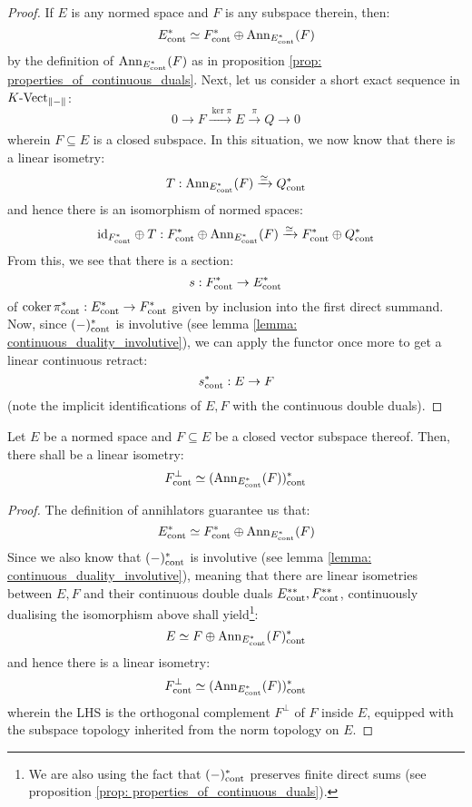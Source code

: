             \begin{proof}
                If $E$ is any normed space and $F$ is any subspace therein, then:
                    $$E^*_{\mathrm{cont}} \simeq F^*_{\mathrm{cont}} \oplus \mathrm{Ann}_{E^*_{\mathrm{cont}}}(F)$$
                by the definition of $\mathrm{Ann}_{E^*_{\mathrm{cont}}}(F)$ as in proposition \ref{prop: properties_of_continuous_duals}. Next, let us consider a short exact sequence in $K\text{-}\mathrm{Vect}_{\left\| {-} \right\|}$:
                    $$0 \to F \xrightarrow[]{\ker \pi} E \xrightarrow[]{\pi} Q \to 0$$
                wherein $F \subseteq E$ is a closed subspace. In this situation, we now know that there is a linear isometry:
                    $$T: \mathrm{Ann}_{E^*_{\mathrm{cont}}}(F) \xrightarrow[]{\simeq} Q^*_{\mathrm{cont}}$$
                and hence there is an isomorphism of normed spaces:
                    $$\mathrm{id}_{F^*_{\mathrm{cont}}} \oplus T: F^*_{\mathrm{cont}} \oplus \mathrm{Ann}_{E^*_{\mathrm{cont}}}(F) \xrightarrow[]{\simeq} F^*_{\mathrm{cont}} \oplus Q^*_{\mathrm{cont}}$$
                From this, we see that there is a section:
                    $$s: F^*_{\mathrm{cont}} \to E^*_{\mathrm{cont}}$$
                of $\operatorname{coker} \pi^*_{\mathrm{cont}}: E^*_{\mathrm{cont}} \to F^*_{\mathrm{cont}}$ given by inclusion into the first direct summand. Now, since $(-)^*_{\mathrm{cont}}$ is involutive (see lemma \ref{lemma: continuous_duality_involutive}), we can apply the functor once more to get a linear continuous retract:
                    $$s^*_{\mathrm{cont}}: E \to F$$
                (note the implicit identifications of $E, F$ with the continuous double duals).
            \end{proof}
        \begin{corollary} \label{coro: annihilators_vs_orthogonal_complements}
            Let $E$ be a normed space and $F \subseteq E$ be a closed vector subspace thereof. Then, there shall be a linear isometry:
                $$F^{\perp}_{\mathrm{cont}} \simeq ( \mathrm{Ann}_{E^*_{\mathrm{cont}}}(F) )^*_{\mathrm{cont}}$$
        \end{corollary}
            \begin{proof}
                The definition of annihlators guarantee us that:
                    $$E^*_{\mathrm{cont}} \simeq F^*_{\mathrm{cont}} \oplus \mathrm{Ann}_{E^*_{\mathrm{cont}}}(F)$$
                Since we also know that $(-)^*_{\mathrm{cont}}$ is involutive (see lemma \ref{lemma: continuous_duality_involutive}), meaning that there are linear isometries between $E, F$ and their continuous double duals $E^{**}_{\mathrm{cont}}, F^{**}_{\mathrm{cont}}$, continuously dualising the isomorphism above shall yield\footnote{We are also using the fact that $(-)^*_{\mathrm{cont}}$ preserves finite direct sums (see proposition \ref{prop: properties_of_continuous_duals}).}:
                    $$E \simeq F \oplus \mathrm{Ann}_{E^*_{\mathrm{cont}}}(F)^*_{\mathrm{cont}}$$
                and hence there is a linear isometry:
                    $$F^{\perp}_{\mathrm{cont}} \simeq ( \mathrm{Ann}_{E^*_{\mathrm{cont}}}(F) )^*_{\mathrm{cont}}$$
                wherein the LHS is the orthogonal complement $F^{\perp}$ of $F$ inside $E$, equipped with the subspace topology inherited from the norm topology on $E$.
            \end{proof}
